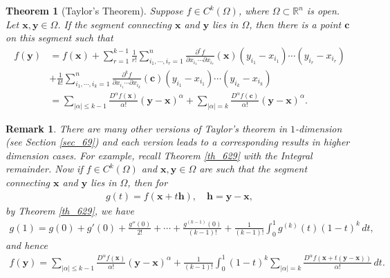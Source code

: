\documentclass[10pt]{book}
\newtheorem{theorem}{Theorem}[chapter]
\newtheorem{remark}{Remark}[chapter]
\theoremstyle{definition}
\numberwithin{equation}{chapter}
\begin{document}
\begin{theorem}[Taylor's Theorem]\label{th_718}
Suppose $f \in C^k(\Omega)$, where $\Omega \subset \mathbb{R}^n$ is open. Let $\mathbf{x}, \mathbf{y} \in \Omega$. If the segment connecting $\mathbf{x}$ and $\mathbf{y}$ lies in $\Omega$, then there is a point $\mathbf{c}$ on this segment such that
\begin{align*}
    f(\mathbf{y}) & = f(\mathbf{x}) + \sum^{k-1}_{r=1} \frac{1}{r!} \sum^n_{i_1,\cdots,i_r=1} \frac{\partial^r f}{\partial x_{i_1} \cdots \partial x_{i_r}}(\mathbf{x}) (y_{i_1} - x_{i_1}) \cdots (y_{i_r} - x_{i_r}) \\
    & + \frac{1}{k!} \sum^n_{i_1,\cdots,i_k=1} \frac{\partial^k f}{\partial x_{i_1} \cdots \partial x_{i_k}}(\mathbf{c}) (y_{i_1} - x_{i_1}) \cdots (y_{i_k} - x_{i_k}) \\
    & = \sum_{\left|\alpha\right| \leq k - 1} \frac{D^{\alpha} f(\mathbf{x})}{\alpha!} (\mathbf{y} - \mathbf{x})^{\alpha} + \sum_{\left|\alpha\right| = k} \frac{D^{\alpha} f(\mathbf{c})}{\alpha!} (\mathbf{y} - \mathbf{x})^{\alpha}.
\end{align*}
\end{theorem}

\medskip

\begin{remark}
There are many other versions of Taylor's theorem in $1$-dimension (see Section \ref{sec_69}) and each version leads to a corresponding results in higher dimension cases. For example, recall Theorem \ref{th_629} with the Integral remainder. Now if $f \in C^k(\Omega)$ and $\mathbf{x}, \mathbf{y} \in \Omega$ are such that the segment connecting $\mathbf{x}$ and $\mathbf{y}$ lies in $\Omega$, then for
\begin{align*}
    g(t) = f(\mathbf{x} + t\mathbf{h}),  \quad \mathbf{h} = \mathbf{y} - \mathbf{x},
\end{align*}
by Theorem \ref{th_629}, we have
\begin{align*}
    g(1) = g(0) + g'(0) + \frac{g''(0)}{2!} + \cdots + \frac{g^{(k-1)}(0)}{(k-1)!} + \frac{1}{(k-1)!} \int^1_0 g^{(k)}(t) (1 - t)^k \,dt,
\end{align*}
and hence
\begin{align*}
    f(\mathbf{y}) = \sum_{\left|\alpha\right| \leq k - 1} \frac{D^{\alpha} f(\mathbf{x})}{\alpha!} (\mathbf{y} - \mathbf{x})^{\alpha} + \frac{1}{(k-1)!} \int^1_0 (1 - t)^k \sum_{\left|\alpha\right| = k} \frac{D^{\alpha} f(\mathbf{x} + t(\mathbf{y} - \mathbf{x}))}{\alpha!} \,dt.
\end{align*}
\end{remark}
\end{document}
